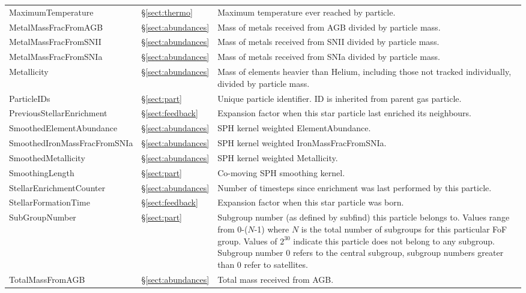 \documentclass[10pt, a4paper]{article}
\newcommand{\subgroupnumber}{Subgroup number (as defined by {\sc subfind}) this
particle belongs to. Values range from 0-($N$-1) where $N$ is the total number
of subgroups for this particular FoF group. Values of $2^{30}$ indicate this
particle does not belong to any subgroup. Subgroup number 0 refers to the
central subgroup, subgroup numbers greater than 0 refer to satellites.}
\begin{document}
\begin{table}
\begin{center}
\begin{tabular}{>{\ttfamily}p{4cm}p{1.5cm}p{11cm}}
MaximumTemperature &
\S\ref{sect:thermo} & Maximum temperature ever reached by particle. \\

MetalMassFracFromAGB &
\S\ref{sect:abundances} &
Mass of metals received from AGB divided by particle mass. \\

MetalMassFracFromSNII &
\S\ref{sect:abundances}  &
Mass of metals received from SNII divided by particle mass. \\

MetalMassFracFromSNIa &
\S\ref{sect:abundances}  &
Mass of metals received from SNIa divided by particle mass. \\

Metallicity &
\S\ref{sect:abundances}  & Mass of elements heavier than Helium, including
those not tracked individually,  divided by particle mass. \\

ParticleIDs &
\S\ref{sect:part} &
Unique particle identifier. ID is inherited from parent gas particle. \\

PreviousStellarEnrichment &
\S\ref{sect:feedback} &
Expansion factor when this star particle last enriched its neighbours. \\

SmoothedElementAbundance &
\S\ref{sect:abundances}  &
SPH kernel weighted ElementAbundance. \\

SmoothedIronMassFracFromSNIa &
\S\ref{sect:abundances}  &
SPH kernel weighted IronMassFracFromSNIa. \\

SmoothedMetallicity &
\S\ref{sect:abundances}  &
SPH kernel weighted Metallicity. \\

SmoothingLength &
\S\ref{sect:part} &
Co-moving SPH smoothing kernel. \\

StellarEnrichmentCounter &
\S\ref{sect:abundances}  &
Number of timesteps since enrichment was last performed by this particle. \\

StellarFormationTime &
\S\ref{sect:feedback} &
Expansion factor when this star particle was born. \\

SubGroupNumber &
\S\ref{sect:part} &
\subgroupnumber \\

TotalMassFromAGB &
\S\ref{sect:abundances} &
Total mass received from AGB. \\


\end{tabular}
\end{center}
\end{table}
\end{document}
